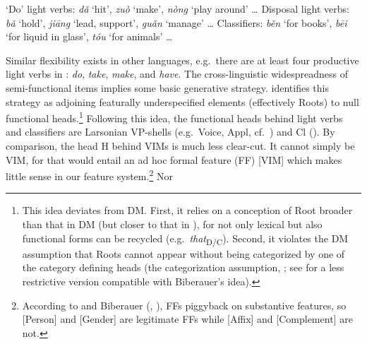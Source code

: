 \documentclass[output=paper]{langsci/langscibook}
\begin{document}
\ea\label{ex:same}
    \ea `Do' light verbs: \textit{d\v{a}} `hit',
        \textit{zu\`{o}} `make', \textit{n\`{o}ng} `play around' \dots{}
    \ex Disposal light verbs: \textit{b\v{a}} `hold', \textit{ji\={a}ng} `lead,
        support', \textit{gu\v{a}n} `manage' \dots{}
    \ex Classifiers: \textit{b\v{e}n} `for books',
        \textit{b\={e}i} `for liquid in glass', \textit{t\'{o}u}
        `for animals' \dots{}
    \z
\z

\noindent Similar flexibility exists in other languages, e.g.\ there are at
least four productive light verbs in : \textit{do}, \textit{take},
\textit{make}, and \textit{have}. The cross-linguistic widespreadness of
semi-functional items implies some basic generative strategy.
\citet[5]{Biberauer2016} identifies this strategy as adjoining featurally
underspecified elements (effectively Roots) to null functional
heads.\footnote{\label{fn5}This idea deviates from \gls{DM}. First, it relies on a
conception of Root broader than that in \gls{DM} (but closer to that in
\citealt{Borer2013}), for not only lexical but also functional forms can be
recycled (e.g.\ \textit{that}\textsubscript{D/C}). Second, it violates the \gls{DM}
assumption that Roots cannot appear without being categorized by one of the
category defining heads (the categorization assumption,
\citealt{EmbickMarantz2008}; see \citealt{Song2017roots} for a less restrictive
version compatible with Biberauer's idea).}
%
%
Following this idea, the functional heads behind light verbs and classifiers
are Larsonian VP-shells (e.g.\ Voice, Appl, cf.\ \citealt{Lohndal2014}) and Cl
(\citealt{Borer2005,Feng2015,Huang2015}). By comparison,
the head H behind \glspl{VIM} is much less clear-cut. It cannot simply be \gls{VIM},
for that would entail an ad hoc formal feature (FF) [VIM] which makes little
sense in our feature system.\footnote{\label{fn6}According to
\citet{Zeijlstra2008} and Biberauer (\citeyear{Biberauer2016},
\citeyear{Biberauer2017}), FFs piggyback on substantive features, so [Person]
and [Gender] are legitimate FFs while [Affix] and [Complement] are not.} Nor
\end{document}
